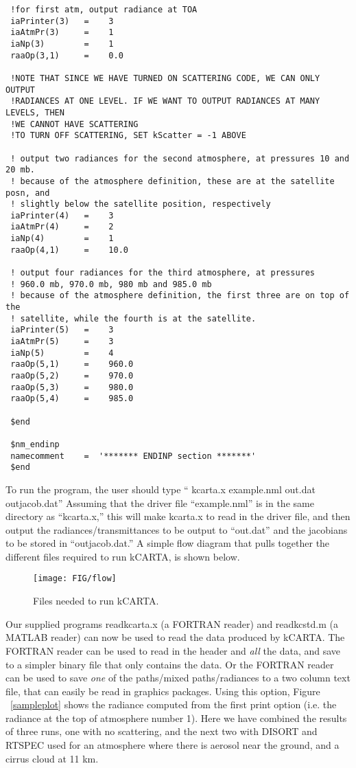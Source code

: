 \documentclass[12pt]{article}
\newcommand{\kc}{\textsf{kCARTA}\xspace}
\begin{document}
\begin{scriptsize}
\begin{verbatim}
 !for first atm, output radiance at TOA
 iaPrinter(3)   =    3
 iaAtmPr(3)     =    1
 iaNp(3)        =    1
 raaOp(3,1)     =    0.0

 !NOTE THAT SINCE WE HAVE TURNED ON SCATTERING CODE, WE CAN ONLY OUTPUT
 !RADIANCES AT ONE LEVEL. IF WE WANT TO OUTPUT RADIANCES AT MANY LEVELS, THEN
 !WE CANNOT HAVE SCATTERING
 !TO TURN OFF SCATTERING, SET kScatter = -1 ABOVE

 ! output two radiances for the second atmosphere, at pressures 10 and 20 mb.
 ! because of the atmosphere definition, these are at the satellite posn, and 
 ! slightly below the satellite position, respectively
 iaPrinter(4)   =    3
 iaAtmPr(4)     =    2
 iaNp(4)        =    1
 raaOp(4,1)     =    10.0

 ! output four radiances for the third atmosphere, at pressures
 ! 960.0 mb, 970.0 mb, 980 mb and 985.0 mb
 ! because of the atmosphere definition, the first three are on top of the 
 ! satellite, while the fourth is at the satellite.
 iaPrinter(5)   =    3
 iaAtmPr(5)     =    3
 iaNp(5)        =    4
 raaOp(5,1)     =    960.0
 raaOp(5,2)     =    970.0
 raaOp(5,3)     =    980.0
 raaOp(5,4)     =    985.0

 $end

 $nm_endinp
 namecomment    =  '******* ENDINP section *******'
 $end

\end{verbatim}
\end{scriptsize}

To run the program, the user should type 
     `` kcarta.x example.nml out.dat outjacob.dat''
Assuming that the driver file ``example.nml'' is in the same
directory as ``kcarta.x,'' this will make kcarta.x to read in the
driver file, and then output the radiances/transmittances to be
output to ``out.dat'' and the jacobians to be stored in ``outjacob.dat.''
A simple flow diagram that pulls together the different files required to
run \kc, is shown below.

\begin{figure}
\texttt{[image: FIG/flow]}
\caption{Files needed to run \kc.}
\end{figure}

Our supplied programs {\sf readkcarta.x} (a {\sf FORTRAN} reader) and
{\sf readkcstd.m} (a {\sf MATLAB} reader) can now be used to read the
data produced by \kc.  The {\sf FORTRAN} reader can be used to read in
the header and {\em all} the data, and save to a simpler binary file
that only contains the data.  Or the {\sf FORTRAN} reader can be used
to save {\em one} of the paths/mixed paths/radiances to a two column
text file, that can easily be read in graphics packages.  Using this
option, Figure ~\ref{sampleplot} shows the radiance computed from the
first print option (i.e. the radiance at the top of atmosphere number 1).
Here we have combined the results of three runs, one with no scattering, and
the next two with DISORT and RTSPEC used for an atmosphere where there is
aerosol near the ground, and a cirrus cloud at 11 km.
\end{document}
